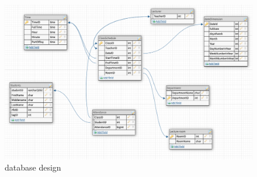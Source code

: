 \begin{figure}[ht]
  \includegraphics[scale=0.4]{Design & Implementation/images/database_design.png}
  \caption{database design}
\end{figure}
